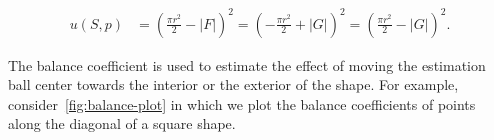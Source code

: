 \begin{align*}
	u(S,p) &= ( \frac{\pi r^2}{2} - |F| )^2 = ( -\frac{\pi r^2}{2} + |G| )^2 = ( \frac{\pi r^2}{2} - |G| )^2.
\end{align*}

The balance coefficient is used to estimate the effect of moving the estimation ball center towards the interior or the exterior of the shape. For example, consider~\cref{fig:balance-plot} in which we plot the balance coefficients of points along the diagonal of a square shape. 

\begin{figure}
\center
\begin{minipage}{0.25\textwidth}
\\%
\\%

\end{minipage}
\end{figure}
